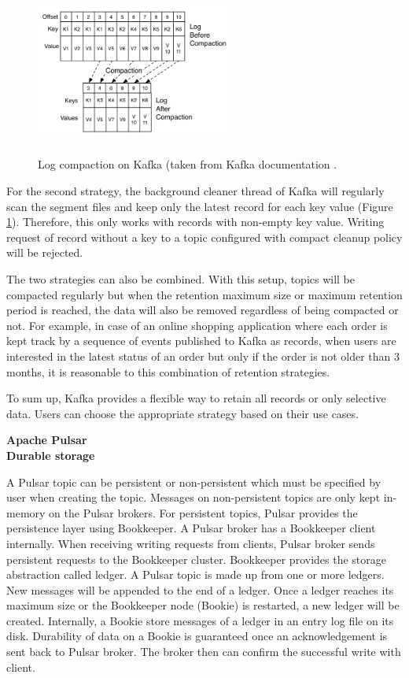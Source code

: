 \begin{figure}[h]
	\centering
	\includegraphics[width=6.5cm,height=5.5cm]{images/compact-kafka.png}
	\caption{Log compaction on Kafka (taken from Kafka documentation \cite{kafkadesignlogcompact}.}
	\label{fig:compactekafka}
\end{figure}
For the second strategy, the background cleaner thread of Kafka will regularly scan the segment files and keep only the latest record for each key value (Figure \ref{fig:compactekafka}). Therefore, this only works with records with non-empty key value. Writing request of record without a key to a topic configured with compact cleanup policy will be rejected.


The two strategies can also be combined. With this setup, topics will be compacted regularly but when the retention maximum size or maximum retention period is reached, the data will also be removed regardless of being compacted or not. For example, in case of an online shopping application where each order is kept track by a sequence of events published to Kafka as records, when users are interested in the latest status of an order but only if the order is not older than 3 months, it is reasonable to this combination of retention strategies.

To sum up, Kafka provides a flexible way to retain all records or only selective data. Users can choose the appropriate strategy based on their use cases. 

\large \textbf{Apache Pulsar}\\
\normalsize
\textbf{Durable storage}

A Pulsar topic can be persistent or non-persistent which must be specified by user when creating the topic. Messages on non-persistent topics are only kept in-memory on the Pulsar brokers. For persistent topics, Pulsar provides the persistence layer using Bookkeeper.  A Pulsar broker has a Bookkeeper client internally. When receiving writing requests from clients, Pulsar broker sends persistent requests to the Bookkeeper cluster. Bookkeeper provides the storage abstraction called ledger. A Pulsar topic is made up from one or more ledgers. New messages will be appended to the end of a ledger. Once a ledger reaches its maximum size or the Bookkeeper node (Bookie) is restarted, a new ledger will be created. Internally, a Bookie store messages of a ledger in an entry log file on its disk. Durability of data on a Bookie is guaranteed once an acknowledgement is sent back to Pulsar broker. The broker then can confirm the successful write with client.


